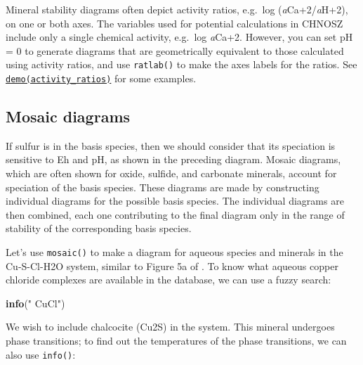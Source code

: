 \documentclass[]{tufte-handout}
\newenvironment{Shaded}{}{}
\newcommand{\KeywordTok}[1]{\textcolor[rgb]{0.00,0.44,0.13}{\textbf{#1}}}
\newcommand{\StringTok}[1]{\textcolor[rgb]{0.25,0.44,0.63}{#1}}
\newcommand{\OperatorTok}[1]{\textcolor[rgb]{0.40,0.40,0.40}{#1}}
\newcommand{\NormalTok}[1]{#1}
\begin{document}
Mineral stability diagrams often depict activity ratios, e.g.~log
(\emph{a}Ca+2/\emph{a}H+2), on one or both axes. The variables used for
potential calculations in CHNOSZ include only a single chemical
activity, e.g.~log \emph{a}Ca+2. However, you can set pH = 0 to generate
diagrams that are geometrically equivalent to those calculated using
activity ratios, and use {\texttt{ratlab()}} to make the axes labels for
the ratios. See \href{../demo}{{\texttt{demo(activity\_ratios)}}} for
some examples.

\hypertarget{mosaic-diagrams}{\subsection{Mosaic
diagrams}\label{mosaic-diagrams}}

If sulfur is in the basis species, then we should consider that its
speciation is sensitive to Eh and pH, as shown in the preceding diagram.
Mosaic diagrams, which are often shown for oxide, sulfide, and carbonate
minerals, account for speciation of the basis species. These diagrams
are made by constructing individual diagrams for the possible basis
species. The individual diagrams are then combined, each one
contributing to the final diagram only in the range of stability of the
corresponding basis species.

Let's use {\texttt{mosaic()}} to make a diagram for aqueous species and
minerals in the Cu-S-Cl-H2O system, similar to Figure 5a of
\citet{CPCC17}. To know what aqueous copper chloride complexes are
available in the database, we can use a fuzzy search:

\begin{Shaded}
\begin{Highlighting}[]
\KeywordTok{info}\NormalTok{(}\StringTok{" CuCl"}\NormalTok{)}
\end{Highlighting}
\end{Shaded}

We wish to include chalcocite (Cu2S) in the system. This mineral
undergoes phase transitions; to find out the temperatures of the phase
transitions, we can also use {\texttt{info()}}:

\begin{Shaded}
\end{Shaded}
\end{document}
